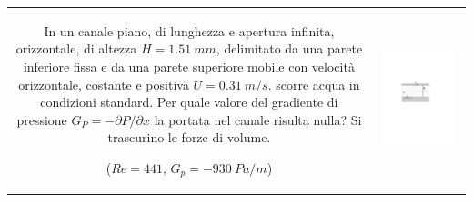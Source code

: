 \noindent
\begin{tabular}{cc}
\begin{minipage}[b]{0.60\textwidth}
\begin{exerciseS}
In un canale piano, di lunghezza e apertura infinita, 
orizzontale, di altezza $H=1.51\ mm$,
delimitato da una parete inferiore fissa e da una parete superiore 
mobile con velocit\`a orizzontale, costante e positiva $U=0.31\ m/s$.
scorre acqua in condizioni standard.
Per quale valore del gradiente di pressione $G_P = -\partial P/\partial x$ la portata nel canale risulta nulla? \newline
Si trascurino le forze di volume.

\vspace{0.5cm}
($ Re = 441$, $G_p = - 930\  Pa/m$)
\end{exerciseS}
\end{minipage}
&
\begin{minipage}[b]{0.35\textwidth}
   \begin{center}
   \includegraphics[width=0.90\textwidth,trim = 160 350 200 320]{./fig/slnEsatte-newton-couette}
   \end{center}
\end{minipage}
\end{tabular}

